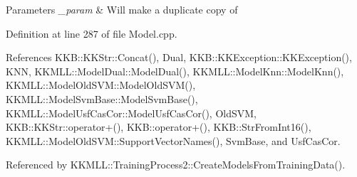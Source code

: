 \begin{DoxyParams}{Parameters}
{\em \+\_\+param} & Will make a duplicate copy of \\
\hline
\end{DoxyParams}


Definition at line 287 of file Model.\+cpp.



References K\+K\+B\+::\+K\+K\+Str\+::\+Concat(), Dual, K\+K\+B\+::\+K\+K\+Exception\+::\+K\+K\+Exception(), K\+NN, K\+K\+M\+L\+L\+::\+Model\+Dual\+::\+Model\+Dual(), K\+K\+M\+L\+L\+::\+Model\+Knn\+::\+Model\+Knn(), K\+K\+M\+L\+L\+::\+Model\+Old\+S\+V\+M\+::\+Model\+Old\+S\+V\+M(), K\+K\+M\+L\+L\+::\+Model\+Svm\+Base\+::\+Model\+Svm\+Base(), K\+K\+M\+L\+L\+::\+Model\+Usf\+Cas\+Cor\+::\+Model\+Usf\+Cas\+Cor(), Old\+S\+VM, K\+K\+B\+::\+K\+K\+Str\+::operator+(), K\+K\+B\+::operator+(), K\+K\+B\+::\+Str\+From\+Int16(), K\+K\+M\+L\+L\+::\+Model\+Old\+S\+V\+M\+::\+Support\+Vector\+Names(), Svm\+Base, and Usf\+Cas\+Cor.



Referenced by K\+K\+M\+L\+L\+::\+Training\+Process2\+::\+Create\+Models\+From\+Training\+Data().


